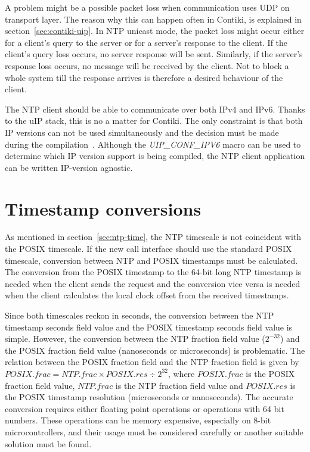 A problem might be a possible packet loss when communication uses UDP on transport layer.
The reason why this can happen often in Contiki, is explained in section~\ref{sec:contiki-uip}.
In NTP unicast mode, the packet loss might occur either for a client's query to the server
or for a server's response to the client.
If the client's query loss occurs, no server response will be sent.
Similarly, if the server's response loss occurs, no message will be received by the client.
Not to block a whole system till the response arrives
is therefore a desired behaviour of the client.

The NTP client should be able to communicate over both IPv4 and IPv6.
Thanks to the uIP stack, this is no a matter for Contiki.
The only constraint is that both IP versions can not be used simultaneously
and the decision must be made during the compilation~\cite{contiki-docs}.
Although the {\it{UIP\_CONF\_IPV6}} macro can be used to determine which IP version
support is being compiled, the NTP client application can be written IP-version agnostic.


\section{Timestamp conversions}
As mentioned in section~\ref{sec:ntp-time}, the NTP timescale is not
coincident with the POSIX timescale.
If the new call interface should use the standard POSIX timescale,
conversion between NTP and POSIX timestamps must be calculated.
The conversion from the POSIX timestamp to the 64-bit long NTP timestamp
is needed when the client sends the request
and the conversion vice versa is needed when the client calculates
the local clock offset from the received timestamps.

Since both timescales reckon in seconds, the conversion between
the NTP timestamp seconds field value and the POSIX timestamp seconds field value is simple.
However, the conversion between the NTP fraction field value ($2^{-32}$)
and the POSIX fraction field value (nanoseconds or microseconds) is problematic.
The relation between the POSIX fraction field and the NTP fraction field
is given by $POSIX.frac = NTP.frac \times POSIX.res \div 2^{32}$,
where $POSIX.frac$ is the POSIX fraction field value,
$NTP.frac$ is the NTP fraction field value and
$POSIX.res$ is the POSIX timestamp resolution (microseconds or nanoseconds).
The accurate conversion requires either floating point operations or operations with 64 bit numbers.
These operations can be memory expensive, especially on 8-bit microcontrollers,
and their usage must be considered carefully or another suitable solution must be found.


